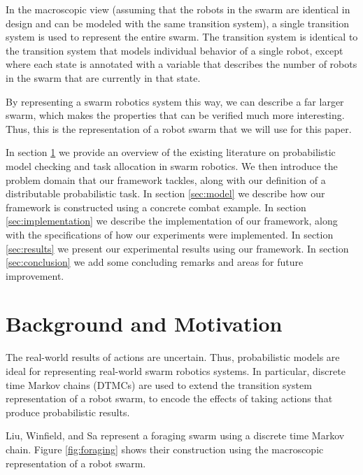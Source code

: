 \documentclass[11pt]{article}
\theoremstyle{definition}
\begin{document}
In the macroscopic view (assuming that the robots
in the swarm are identical in design and can be
modeled with the same transition system), a single
transition system is used to represent the entire
swarm. The transition system is identical to the
transition system that models individual behavior of
a single robot, except where each state is
annotated with a variable that describes the
number of robots in the swarm that are currently
in that state. \cite{konur12}

By representing a swarm robotics system this way,
we can describe a far larger swarm,
which makes the properties that can be verified
much more interesting. Thus, this is the representation
of a robot swarm that we will use for this paper.

In section \ref{sec:background-motivation} we provide an overview of the
existing literature on probabilistic model checking and
task allocation in swarm robotics. We then introduce
the problem domain that our framework tackles,
along with our definition of a distributable probabilistic
task. In section \ref{sec:model} we describe how our framework
is constructed using a concrete combat example. In section
\ref{sec:implementation} we describe the implementation of
our framework, along with the specifications of how our
experiments were implemented. In section \ref{sec:results}
we present our experimental results using our framework.
In section \ref{sec:conclusion} we add some concluding remarks
and areas for future improvement.

\section{Background and Motivation}\label{sec:background-motivation}

The real-world results of actions are uncertain. Thus,
probabilistic models are ideal for representing
real-world swarm robotics systems.
In particular, discrete time Markov chains (DTMCs)
are used to extend the transition system representation
of a robot swarm, to encode the effects of taking actions
that produce probabilistic results.

Liu, Winfield, and Sa represent a foraging swarm
using a discrete time Markov chain. Figure \ref{fig:foraging}
shows their construction using the macroscopic
representation of a robot swarm.
\end{document}
